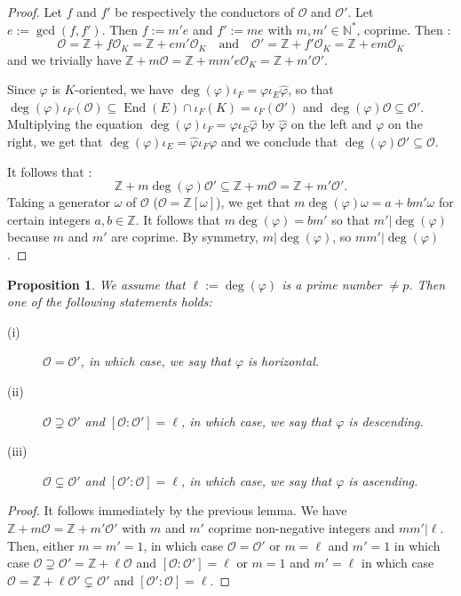 \documentclass[a4paper,10pt,notitlepage]{report}
\theoremstyle{definition}
\theoremstyle{plain}
\newtheorem{Proposition}[Definition]{Proposition}
\theoremstyle{definition}
\newcommand{\N}{\mathbb{N}}
\newcommand{\Z}{\mathbb{Z}}
\newcommand{\mO}{\mathcal{O}}
\renewcommand{\(}{\left(}
\renewcommand{\)}{\right)}
\DeclareMathOperator{\End}{End}
\begin{document}
\begin{proof}
Let $f$ and $f'$ be respectively the conductors of $\mO$ and $\mO'$.  Let $e:=\gcd(f,f')$.  Then $f:=m'e$ and $f':=me$ with $m,m'\in\N^*$,  coprime.  Then :
\[\mO=\Z+f\mO_K=\Z+em'\mO_K \quad \mbox{and} \quad \mO'=\Z+f'\mO_K=\Z+em\mO_K\]
and we trivially have $\Z+m\mO=\Z+mm'e\mO_K=\Z+m'\mO'$.

Since $\varphi$ is $K$-oriented,  we have $\deg(\varphi)\iota_F=\varphi\iota_E\widehat{\varphi}$,  so that $\deg(\varphi)\iota_F(\mO)\subseteq \End(E)\cap\iota_F(K)=\iota_F(\mO')$ and $\deg(\varphi)\mO\subseteq \mO'$.  Multiplying the equation $\deg(\varphi)\iota_F=\varphi\iota_E\widehat{\varphi}$ by $\widehat{\varphi}$ on the left and $\varphi$ on the right, we get that $\deg(\varphi)\iota_E=\widehat{\varphi}\iota_F\varphi$ and we conclude that $\deg(\varphi)\mO'\subseteq \mO$. 

It follows that :
\[\Z+m\deg(\varphi)\mO'\subseteq \Z+m\mO= \Z+m'\mO'.\]
Taking a generator $\omega$ of $\mO$ ($\mO=\Z[\omega]$),  we get that $m\deg(\varphi)\omega=a+bm'\omega$ for certain integers $a,b\in\Z$.  It follows that $m\deg(\varphi)=bm'$ so that $m'|\deg(\varphi)$ because $m$ and $m'$ are coprime.  By symmetry,  $m|\deg(\varphi)$,  so $mm'|\deg(\varphi)$.
\end{proof}

\begin{Proposition}\label{Proposition 4}
We assume that $\ell:=\deg(\varphi)$ is a prime number $\neq p$.  Then one of the following statements holds:
\begin{description}
\item[(i)] $\mO=\mO'$,  in which case,  we say that $\varphi$ is \emph{horizontal}.
\item[(ii)] $\mO\supsetneq \mO'$ and $[\mO:\mO']=\ell$,  in which case,  we say that $\varphi$ is \emph{descending}. 
\item[(iii)] $\mO\subsetneq \mO'$ and $[\mO':\mO]=\ell$,  in which case,  we say that $\varphi$ is \emph{ascending}. 
\end{description}
\end{Proposition}

\begin{proof}
It follows immediately by the previous lemma.  We have $\Z+m\mO=\Z+m'\mO'$ with $m$ and $m'$ coprime non-negative integers and $mm'|\ell$.  Then,  either $m=m'=1$,  in which case $\mO=\mO'$ or $m=\ell$ and $m'=1$  in which case $\mO\supsetneq \mO'=\Z+\ell\mO$ and $[\mO:\mO']=\ell$ or $m=1$ and $m'=\ell$  in which case $\mO=\Z+\ell\mO'\subsetneq \mO'$ and $[\mO':\mO]=\ell$.
\end{proof}
\end{document}
